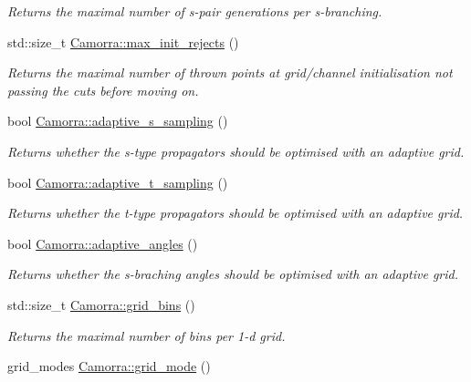 \begin{DoxyCompactItemize}
\begin{DoxyCompactList}\small\item\em Returns the maximal number of s-\/pair generations per s-\/branching. \end{DoxyCompactList}\item 
std::size\_\-t \hyperlink{a00800_ae431c1ee83b717ad5ee259ea0b29e46d}{Camorra::max\_\-init\_\-rejects} ()
\begin{DoxyCompactList}\small\item\em Returns the maximal number of thrown points at grid/channel initialisation not passing the cuts before moving on. \end{DoxyCompactList}\item 
bool \hyperlink{a00800_a54293db384f71be66101216d13cd5b13}{Camorra::adaptive\_\-s\_\-sampling} ()
\begin{DoxyCompactList}\small\item\em Returns whether the s-\/type propagators should be optimised with an adaptive grid. \end{DoxyCompactList}\item 
bool \hyperlink{a00800_a249c2403f0350fffedf4785f6348924e}{Camorra::adaptive\_\-t\_\-sampling} ()
\begin{DoxyCompactList}\small\item\em Returns whether the t-\/type propagators should be optimised with an adaptive grid. \end{DoxyCompactList}\item 
bool \hyperlink{a00800_af43bdefe26b0a357ead80b081285b99f}{Camorra::adaptive\_\-angles} ()
\begin{DoxyCompactList}\small\item\em Returns whether the s-\/braching angles should be optimised with an adaptive grid. \end{DoxyCompactList}\item 
\hypertarget{a00800_a5febf7380bc1a76257efddb93a86f603}{
std::size\_\-t \hyperlink{a00800_a5febf7380bc1a76257efddb93a86f603}{Camorra::grid\_\-bins} ()}
\label{a00800_a5febf7380bc1a76257efddb93a86f603}

\begin{DoxyCompactList}\small\item\em Returns the maximal number of bins per 1-\/d grid. \end{DoxyCompactList}\item 
\hypertarget{a00800_a73aef909f3351e47a5947caaaa248c96}{
grid\_\-modes \hyperlink{a00800_a73aef909f3351e47a5947caaaa248c96}{Camorra::grid\_\-mode} ()}
\label{a00800_a73aef909f3351e47a5947caaaa248c96}


\end{DoxyCompactItemize}
